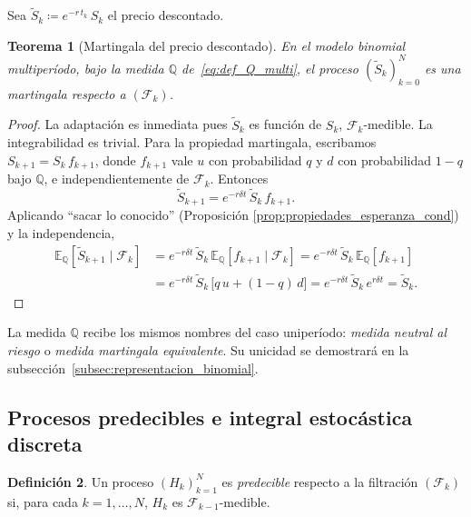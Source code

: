 \documentclass[11pt,a4paper,oneside]{report}
\theoremstyle{plain}
\newtheorem{teorema}{Teorema}[chapter]
\theoremstyle{definition}
\newtheorem{definicion}[teorema]{Definición}
\theoremstyle{remark}
\newcommand{\E}{\mathbb{E}}
\newcommand{\Q}{\mathbb{Q}}
\newcommand{\F}{\mathcal{F}}
\newcommand{\1}{\mathbf{1}}
\newcommand{\eqdef}{\coloneqq}
\begin{document}
Sea
$\widetilde S_k \eqdef e^{-r\, t_k}\, S_k$ el precio descontado.

\begin{teorema}[Martingala del precio descontado]
\label{teo:martingala_precio_descontado}
En el modelo binomial multiperíodo, bajo la medida $\Q$
de~\eqref{eq:def_Q_multi}, el proceso $(\widetilde S_k)_{k=0}^{N}$ es
una martingala respecto a $(\F_k)$.
\end{teorema}

\begin{proof}
La adaptación es inmediata pues $\widetilde S_k$ es función de $S_k$,
$\F_k$-medible. La integrabilidad es trivial. Para la propiedad
martingala, escribamos $S_{k+1} = S_k\, f_{k+1}$, donde $f_{k+1}$ vale
$u$ con probabilidad $q$ y $d$ con probabilidad $1-q$ bajo $\Q$, e
independientemente de $\F_k$. Entonces
\begin{equation*}
  \widetilde S_{k+1} = e^{-r \delta t}\, \widetilde S_k\, f_{k+1}.
\end{equation*}
Aplicando ``sacar lo conocido'' (Proposición
\ref{prop:propiedades_esperanza_cond}) y la independencia,
\begin{align*}
  \E_\Q[\widetilde S_{k+1} \mid \F_k]
  &= e^{-r \delta t}\, \widetilde S_k\, \E_\Q[f_{k+1} \mid \F_k]
   = e^{-r \delta t}\, \widetilde S_k\, \E_\Q[f_{k+1}] \\
  &= e^{-r \delta t}\, \widetilde S_k\,\bigl[q\, u + (1 - q)\, d\bigr]
   = e^{-r \delta t}\, \widetilde S_k\, e^{r \delta t}
   = \widetilde S_k.
\end{align*}
\end{proof}

La medida $\Q$ recibe los mismos nombres del caso uniperíodo:
\emph{medida neutral al riesgo} o \emph{medida martingala
equivalente}. Su unicidad se demostrará en la
subsección~\ref{subsec:representacion_binomial}.

\subsection{Procesos predecibles e integral estocástica discreta}
\label{subsec:predecibles_int_disc}

\medskip

\begin{definicion}
\label{def:predecible}
Un proceso $(H_k)_{k=1}^{N}$ es \emph{predecible} respecto a la
filtración $(\F_k)$ si, para cada $k = 1, \ldots, N$, $H_k$ es
$\F_{k-1}$-medible.
\end{definicion}
\end{document}
